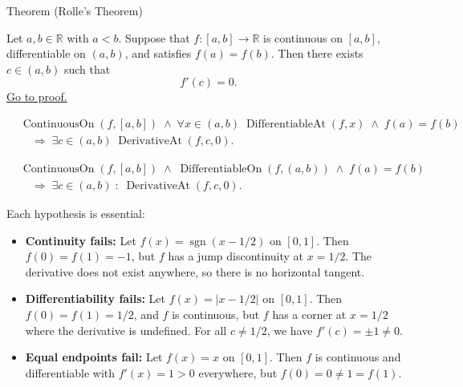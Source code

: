 
\begin{theorembox}{Theorem (Rolle's Theorem)}
\begin{theorem}
\label{thm:rolles-theorem}
Let $a, b \in \mathbb{R}$ with $a < b$. Suppose that $f : [a,b] \to \mathbb{R}$ is continuous on $[a,b]$, differentiable on $(a,b)$, and satisfies $f(a) = f(b)$. Then there exists $c \in (a,b)$ such that
\[
f'(c) = 0.
\]
\hyperref[prf:rolles-theorem]{Go to proof.}
\end{theorem}
\end{theorembox}

\begin{remark*}
\begin{align*}
&\operatorname{ContinuousOn}(f,[a,b])
\;\land\;
\forall x \in (a,b)\;\operatorname{DifferentiableAt}(f,x)
\;\land\;
f(a)=f(b)\\
&\quad\Rightarrow\;
\exists c \in (a,b)\;\operatorname{DerivativeAt}(f,c,0).
\end{align*}
\end{remark*}

\begin{remark*}
\begin{align*}
&\operatorname{ContinuousOn}(f,[a,b])
\;\land\;
\operatorname{DifferentiableOn}(f,(a,b))
\;\land\;
f(a)=f(b)\\
&\quad\Longrightarrow\;
\exists c\in(a,b)\;:\;\operatorname{DerivativeAt}(f,c,0).
\end{align*}
\end{remark*}

\begin{remark*}
Each hypothesis is essential:
\begin{itemize}
  \item \textbf{Continuity fails:} Let $f(x) = \operatorname{sgn}(x - 1/2)$ on $[0,1]$. Then $f(0) = f(1) = -1$, but $f$ has a jump discontinuity at $x = 1/2$. The derivative does not exist anywhere, so there is no horizontal tangent.
  \item \textbf{Differentiability fails:} Let $f(x) = |x - 1/2|$ on $[0,1]$. Then $f(0) = f(1) = 1/2$, and $f$ is continuous, but $f$ has a corner at $x = 1/2$ where the derivative is undefined. For all $c \ne 1/2$, we have $f'(c) = \pm 1 \ne 0$.
  \item \textbf{Equal endpoints fail:} Let $f(x) = x$ on $[0,1]$. Then $f$ is continuous and differentiable with $f'(x) = 1 > 0$ everywhere, but $f(0) = 0 \ne 1 = f(1)$.
\end{itemize}
\end{remark*}

